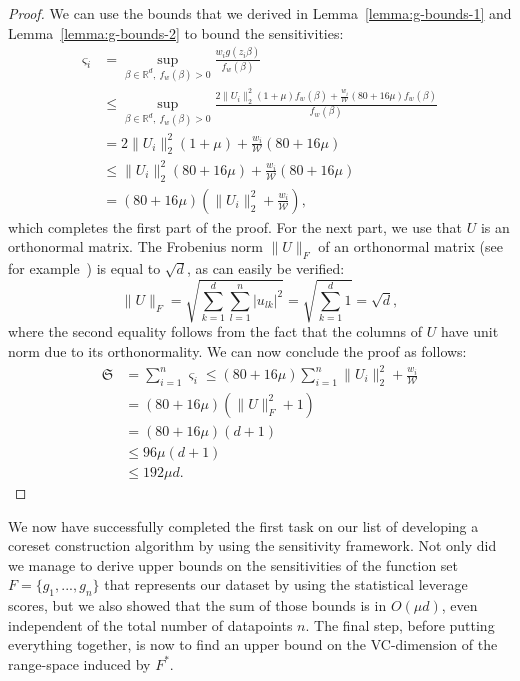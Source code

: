 \begin{proof}
    We can use the bounds that we derived in Lemma~\ref{lemma:g-bounds-1}
    and Lemma~\ref{lemma:g-bounds-2} to bound the sensitivities:
    \begin{align*}
        \varsigma_i
         & = \sup_{\beta \in \mathbb{R}^d,\ f_w(\beta)>0} \frac{w_i g(z_i \beta)}{f_w(\beta)}                   \\
         & \leq \sup_{\beta \in \mathbb{R}^d,\ f_w(\beta)>0} \frac{2 \lVert U_i \rVert_2^2 (1 + \mu) f_w(\beta)
            + \frac{w_i}{\mathcal{W}} (80 + 16 \mu) f_w(\beta)}{f_w(\beta)}                                     \\
         & = 2 \lVert U_i \rVert_2^2 (1 + \mu) + \frac{w_i}{\mathcal{W}} (80 + 16 \mu)                          \\
         & \leq \lVert U_i \rVert_2^2 (80 + 16 \mu) +  \frac{w_i}{\mathcal{W}} (80 + 16 \mu)                    \\
         & = (80 + 16\mu)(\lVert U_i \rVert_2^2 + \frac{w_i}{\mathcal{W}}),
    \end{align*}
    which completes the first part of the proof.
    For the next part, we use that $U$ is an orthonormal matrix.
    The Frobenius norm $\lVert U \rVert_F$
    of an orthonormal matrix (see for example~\cite{matrix-computations})
    is equal to $\sqrt{d}$, as can easily be verified:
    \begin{equation*}
        \lVert U \rVert_F = \sqrt{\sum_{k=1}^d \sum_{l=1}^n \lvert u_{lk} \rvert^2}
        = \sqrt{\sum_{k=1}^d 1} = \sqrt{d},
    \end{equation*}
    where the second equality follows from the fact that the columns of
    $U$ have unit norm due to its orthonormality. We can now conclude the
    proof as follows:
    \begin{align*}
        \mathfrak{S}
         & = \sum_{i=1}^n \varsigma_i \leq (80 + 16\mu) \sum_{i=1}^n \lVert U_i \rVert_2^2 + \frac{w_i}{\mathcal{W}} \\
         & = (80 + 16 \mu)(\lVert U \rVert_F^2 + 1)                                                                  \\
         & = (80 + 16 \mu)(d + 1)                                                                                    \\
         & \leq 96 \mu(d + 1)                                                                                        \\
         & \leq 192 \mu d.
    \end{align*}
\end{proof}

We now have successfully completed the first task on our list of
developing a coreset construction algorithm by using the
sensitivity framework. Not only did we manage to derive upper bounds
on the sensitivities of the function set $F = \{g_1, ..., g_n\}$
that represents our dataset by using the
statistical leverage scores, but we also showed that
the sum of those bounds is in $O(\mu d)$, even independent of
the total number of datapoints $n$.
The final step, before putting everything together, is now to find
an upper bound on the VC-dimension of the range-space
induced by $F^\ast$.
